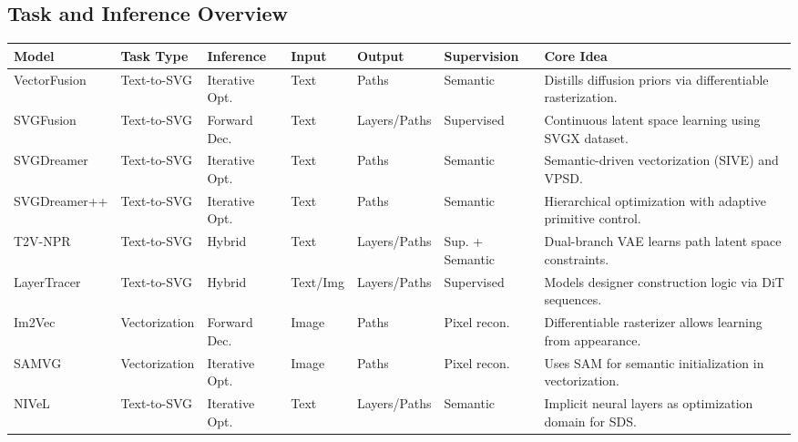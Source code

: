 \begin{landscape}
\section{Task and Inference Overview}
\label{app:task_overview}

\begin{center}
\small
{}
\label{tab:app_task_overview}
\begin{tabularx}{\linewidth}{>{\raggedright\arraybackslash}p{2.85cm} >{\raggedright\arraybackslash}p{2.32cm} >{\raggedright\arraybackslash}p{2.10cm} >{\raggedright\arraybackslash}p{1.45cm} >{\raggedright\arraybackslash}p{2.35cm} >{\raggedright\arraybackslash}p{2.35cm} >{\raggedright\arraybackslash}X}
\toprule
\textbf{Model} & \textbf{Task Type} & \textbf{Inference} & \textbf{Input} & \textbf{Output} & \textbf{Supervision} & \textbf{Core Idea} \\
\midrule
VectorFusion & Text-to-SVG & Iterative Opt. & Text & Paths & Semantic & Distills diffusion priors via differentiable rasterization. \\
        SVGFusion & Text-to-SVG & Forward Dec. & Text & Layers/Paths & Supervised & Continuous latent space learning using SVGX dataset. \\
        SVGDreamer & Text-to-SVG & Iterative Opt. & Text & Paths & Semantic & Semantic-driven vectorization (SIVE) and VPSD. \\
        SVGDreamer++ & Text-to-SVG & Iterative Opt. & Text & Paths & Semantic & Hierarchical optimization with adaptive primitive control. \\
        T2V-NPR & Text-to-SVG & Hybrid & Text & Layers/Paths & Sup. + Semantic & Dual-branch VAE learns path latent space constraints. \\
        LayerTracer & Text-to-SVG & Hybrid & Text/Img & Layers/Paths & Supervised & Models designer construction logic via DiT sequences. \\
        Im2Vec & Vectorization & Forward Dec. & Image & Paths & Pixel recon. & Differentiable rasterizer allows learning from appearance. \\
        SAMVG & Vectorization & Iterative Opt. & Image & Paths & Pixel recon. & Uses SAM for semantic initialization in vectorization. \\
        NIVeL & Text-to-SVG & Iterative Opt. & Text & Layers/Paths & Semantic & Implicit neural layers as optimization domain for SDS. \\

\end{tabularx}
\end{center}
\end{landscape}
